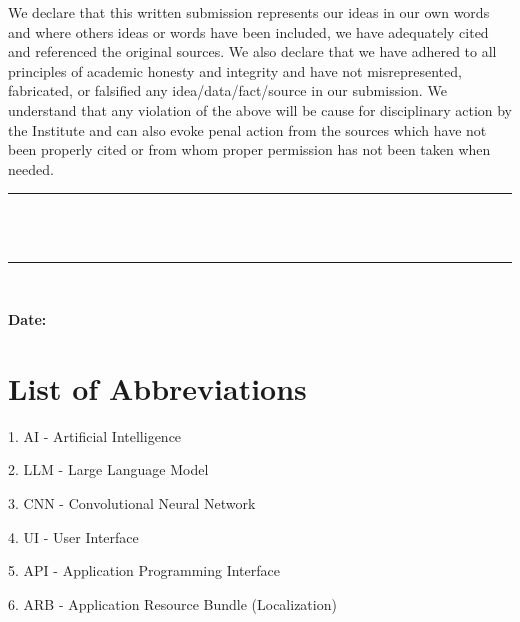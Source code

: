 \documentclass[12pt, a4paper]{report}
\newcommand{\abbrlabel}[1]{\makebox[3cm][l]{\textbf{#1}\ \dotfill}}
\newenvironment{abbreviations}{\begin{list}{}{\renewcommand{\makelabel}{\abbrlabel}}}{\end{list}}
\begin{document}
\vspace{0.5cm}

\justifying

We declare that this written submission represents our ideas in our own
words and where others ideas or words have been included, we have adequately
cited and referenced the original sources. We also declare that we have adhered to
all principles of academic honesty and integrity and have not misrepresented,
fabricated, or falsified any idea/data/fact/source in our submission. We understand
that any violation of the above will be cause for disciplinary action by the Institute
and can also evoke penal action from the sources which have not been properly
cited or from whom proper permission has not been taken when needed.

\vspace{2cm}

\begin{flushright}
    \rule{6cm}{0.5pt} \\[-0.4cm]
     \\[0.5cm]
    \rule{6cm}{0.5pt} \\[-0.4cm]
\end{flushright}

\vfill

\noindent
\textbf{Date:}\\[2em]

\clearpage

\renewcommand*\contentsname{Table Of Content}
\pagestyle{fancy}

\tableofcontents



\pagestyle{fancy}
\listoffigures
\listoftables
\newpage
\chapter*{List of Abbreviations}


\begin{abbreviations}
 1. AI - Artificial Intelligence
 
 2. LLM - Large Language Model
 
 3. CNN - Convolutional Neural Network
 
 4. UI - User Interface
 
 5. API - Application Programming Interface
 
 6. ARB - Application Resource Bundle (Localization)

\end{abbreviations}
\end{document}
